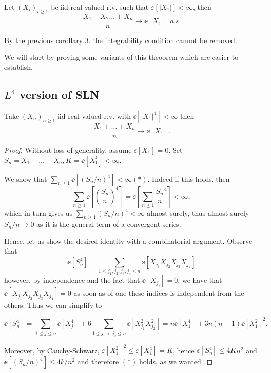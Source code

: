 \documentclass[../main.tex]{subfiles}
\begin{document}
  \begin{theorem}
    Let $(X_i)_{i \geq 1}$ be iid real-valued r.v. such that $\ee[|X_1|] <
    \infty$, then
    \[
      \frac{X_1 + X_2 \ldots + X_n}{n} \to \ee[X_1] \;\;a.s
    .\] 
  \end{theorem}

  By the previous corollary 3. the integrability condition cannot be removed.

  \vspace{1em}

  We will start by proving some variants of this theoorem which are easier to
  establish.

  \subsection{$L^4$ version of SLN}
  \begin{theorem}
     Take $(X_n)_{n \geq 1}$ iid real valued r.v. with
    $\ee[|X_1|^4] < \infty$ then 
    \[
      \frac{X_1 + \ldots + X_n}{n} \to \ee[X_1] 
    .\] 
  \end{theorem}
  \begin{proof}
    Without loss of generality, assume $\ee[X_1] = 0$. Set $S_n = X_1 + \ldots
    +X_n, K = \ee[X_1^4] < \infty$.
    \vspace{0.4em}

    We show that $\sum_{n \geq 1} \ee[ (S_n/n)^4] < \infty (\ast)$. Indeed if this
    holds, then 
    \[
      \sum_{n \geq 1} \ee \left[ \left( \frac{S_n}{n}  \right) ^4 \right] = \ee
      \left[ \sum_{n \geq 1} \frac{S_n}{n} ^4 \right] < \infty
    ,\] 
  which in turn gives us $\sum_{n \geq 1} (S_n/n)^4 < \infty$ almost surely,
    thus
    almost surely $S_n/n \to 0 $ as it is the general term of a convergent
    series.

    \vspace{0.5em}

    Hence, let us show the desired identity with a combinatorial argument.
    Observe that 
    $$\ee[S_n^4] = \sum_{1 \leq j_1, j_2, j_3, j_4 \leq n} \ee[ X_{j_1} X_{j_2} X_{j_3}
    X_{j_4}]$$
    however, by independence and the fact that $\ee[X_{j_i}] = 0$, we have that
    $\ee[X_{j_1} X_{j_2} X_{j_3} X_{j_4}] = 0$ as soon as of one these indices
    is independent from the others. Thus we can simplify to

    \[
      \ee[S_n^4] = \sum_{1 \leq j \leq n} \ee[X_j^4] + 6\sum_{1 \leq j_1 < j_2
      \leq n} \ee[X_{j_1}^2 X_{j_2}^2] = n \ee[X_1^4] + 3n(n-1)\ee[X_1^2]^2
    .\] 

    Moreover, by Cauchy-Schwarz, $\ee[X_1^2]^2 \leq \ee[X_1^4] = K$, hence 
    $\ee[S_n^4] \leq 4K n^2$ and $\ee[(S_n / n)^4] \leq 4k/n^2$ and therefore
    $(\ast)$ holds, as we wanted.
  \end{proof} 
\end{document}
